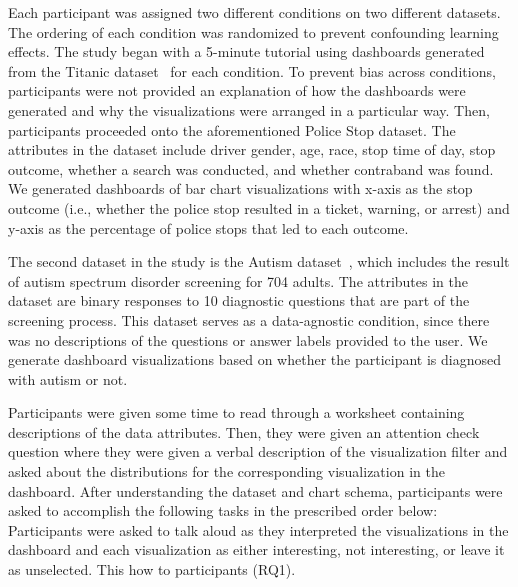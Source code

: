 \par Each participant was assigned two different conditions on two different datasets. The ordering of each condition was randomized to prevent confounding learning effects. The study began with a 5-minute tutorial using dashboards generated from the Titanic dataset~\cite{titanic} for each condition. To prevent bias across conditions, participants were not provided an explanation of how the dashboards were generated and why the visualizations were arranged in a particular way. Then, participants proceeded onto the aforementioned Police Stop dataset. The attributes in the dataset include driver gender, age, race, stop time of day, stop outcome, whether a search was conducted, and whether contraband was found. We generated dashboards of bar chart visualizations with x-axis as the stop outcome (i.e., whether the police stop resulted in a ticket, warning, or arrest) and y-axis as the percentage of police stops that led to each outcome. %
\par The second dataset in the study is the Autism dataset~\cite{autism}, which includes the result of autism spectrum disorder screening for 704 adults. The attributes in the dataset are binary responses to 10 diagnostic questions that are part of the screening process. This dataset serves as a data-agnostic condition, since there was no descriptions of the questions or answer labels provided to the user. We generate dashboard visualizations based on whether the participant is diagnosed with autism or not.
\par Participants were given some time to read through a worksheet containing descriptions of the data attributes. Then, they were given an attention check question where they were given a verbal description of the visualization filter and asked about the distributions for the corresponding visualization in the dashboard. After understanding the dataset and chart schema, participants were asked to accomplish the following tasks in the prescribed order below:
 Participants were asked to talk aloud as they interpreted the visualizations in the dashboard and  each visualization as either interesting, not interesting, or leave it as unselected. This  how  to participants (RQ1).%
